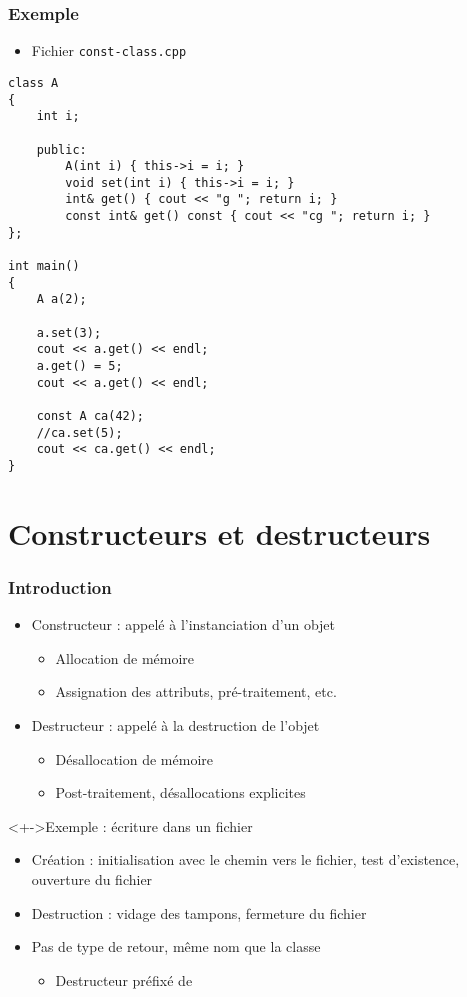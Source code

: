 \begin{frame}[containsverbatim]
\frametitle{Exemple}
\begin{itemize}
\item Fichier \texttt{const-class.cpp}
\end{itemize}
\begin{lstlisting}
class A
{
    int i;   
    
    public:
        A(int i) { this->i = i; }
        void set(int i) { this->i = i; }
        int& get() { cout << "g "; return i; }
        const int& get() const { cout << "cg "; return i; }
};

int main()
{
    A a(2);   
    
    a.set(3);
    cout << a.get() << endl;
    a.get() = 5;
    cout << a.get() << endl;
    
    const A ca(42);
    //ca.set(5);
    cout << ca.get() << endl;
}
\end{lstlisting}
\end{frame}

\section{Constructeurs et destructeurs}

\begin{frame}
\frametitle{Introduction}
\begin{itemize}[<+->]
\item Constructeur : appelé à l'instanciation d'un objet
	\begin{itemize}
	\item Allocation de mémoire
	\item Assignation des attributs, pré-traitement, etc.
	\end{itemize}
\item Destructeur : appelé à la destruction de l'objet
	\begin{itemize}
	\item Désallocation de mémoire
	\item Post-traitement, désallocations explicites
	\end{itemize}
\end{itemize}
\begin{exampleblock}<+->{Exemple : écriture dans un fichier}
	\begin{itemize}[<+->]
	\item Création : initialisation avec le chemin vers le fichier, test d'existence, ouverture du fichier
	\item Destruction : vidage des tampons, fermeture du fichier
	\end{itemize}
\end{exampleblock}
\begin{itemize}[<+->]
\item Pas de type de retour, même nom que la classe
	\begin{itemize}
	\item Destructeur préfixé de \texttt{\texttildelow}
	\end{itemize}
\end{itemize}
\end{frame}

